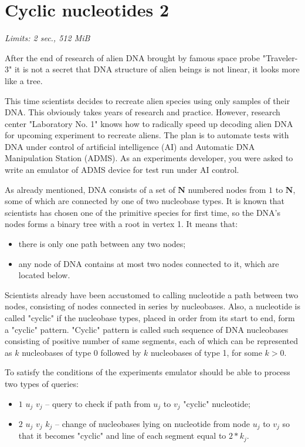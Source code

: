 \documentclass [11pt, a4paper, oneside, notitlepage] {article}
\begin{document}
\section*{Cyclic nucleotides 2}
\hspace{1cm}
\emph{Limits: 2 sec., 512 MiB}
\bigskip

After the end of research of alien DNA brought by famous space probe "Traveler-3" it is not a secret that DNA structure of alien beings is not linear, it looks more like a tree.

This time scientists decides to recreate alien species using only samples of their DNA. This obviously takes years of research and practice. However, research center "Laboratory No. 1" knows how to radically speed up decoding alien DNA for upcoming experiment to recreate aliens. The plan is to automate tests with DNA under control of artificial intelligence (AI) and Automatic DNA Manipulation Station (ADMS). As an experiments developer, you were asked to write an emulator of ADMS device for test run under AI control.


As already mentioned, DNA consists of a set of $\mathbf{N}$ numbered nodes from $1$ to $\mathbf{N}$, some of which are connected by one of two nucleobase types. It is known that scientists has chosen one of the primitive species for first time, so the DNA's nodes forms a binary tree with a root in vertex 1. It means that:

\begin{itemize}
    \item there is only one path between any two nodes;
    \item any node of DNA contains at most two nodes connected to it, which are located below.
\end{itemize}

Scientists already have been accustomed to calling nucleotide a path between two nodes, consisting of nodes connected in series by nucleobases. Also, a nucleotide is called "cyclic" if the nucleobase types, placed in order from its start to end, form a "cyclic" pattern. "Cyclic" pattern is called such sequence of DNA nucleobases consisting of positive number of same segments, each of which can be represented as $k$ nucleobases of type 0 followed by $k$ nucleobases of type 1, for some $k > 0$.

To satisfy the conditions of the experiments emulator should be able to process two types of queries:

\begin{itemize}
    \item $1$ $u_j$ $v_j$ -- query to check if path from $u_j$ to $v_j$ "cyclic" nucleotide;
    \item $2$ $u_j$ $v_j$ $k_j$ -- change of nucleobases lying on nucleotide from node $u_j$ to $v_j$ so that it becomes "cyclic" and line of each segment equal to $2 * k_j$.
\end{itemize}
\end{document}
